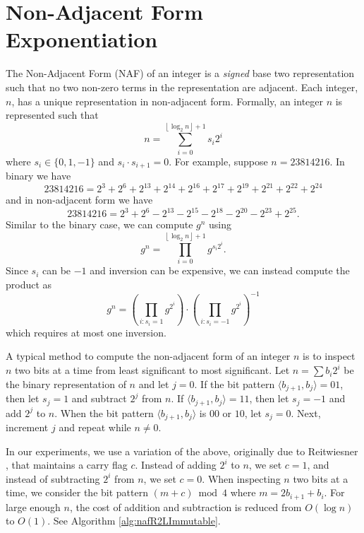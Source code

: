 \documentclass{ucalgthes1}
\theoremstyle{definition}
\newcommand{\floor}[1]{\left\lfloor #1 \right\rfloor}
\begin{document}
\bigbreak
\section{Non-Adjacent Form Exponentiation}
\label{section:naf}

The Non-Adjacent Form (NAF) of an integer is a \emph{signed} base two representation such that no two non-zero terms in the representation are adjacent. Each integer, $n$, has a unique representation in non-adjacent form. Formally, an integer $n$ is represented such that
\[
	n = \sum_{i=0}^{\floor{\log_2 n}+1} s_i 2^i
\]
where $s_i \in \{0, 1, -1\}$ and $s_i \cdot s_{i+1} = 0$. For example, suppose $n = 23814216$.  In binary we have
\begin{equation}\label{eq:binaryEg}
	23814216 = 2^3+2^6+2^{13}+2^{14}+2^{16}+2^{17}+2^{19}+2^{21}+2^{22}+2^{24}
\end{equation}
and in non-adjacent form we have
\begin{equation}\label{eq:nafEg}
	23814216 = 2^3+2^6-2^{13}-2^{15}-2^{18}-2^{20}-2^{23}+2^{25}.
\end{equation}
Similar to the binary case, we can compute $g^n$ using
\[
	g^n = \prod _{i=0}^{\floor{\log_2 n}+1} g^{s_i 2^i}.
\]
Since $s_i$ can be $-1$ and inversion can be expensive, we can instead compute the product as
\[
	g^n = \left( \prod_{i : s_i=1} g^{2^i} \right) \cdot \left( \prod_{i : s_i=-1} g^{2^i} \right)^{-1}
\]
which requires at most one inversion.

A typical method to compute the non-adjacent form of an integer $n$ is to inspect $n$ two bits at a time from least significant to most significant.  Let $n=\sum b_i2^i$ be the binary representation of $n$ and let $j=0$.  If the bit pattern $\langle b_{j+1}, b_j \rangle = 01$, then let $s_j = 1$ and subtract $2^j$ from $n$.  If $\langle b_{j+1}, b_j \rangle = 11$, then let $s_j = -1$ and add $2^j$ to $n$.  When the bit pattern $\langle b_{j+1}, b_j \rangle$ is $00$ or $10$, let $s_j = 0$. Next, increment $j$ and repeat while $n \ne 0$.

In our experiments, we use a variation of the above, originally due to Reitwiesner \cite{reitwiesner1960}, that maintains a carry flag $c$.  Instead of adding $2^i$ to $n$, we set $c = 1$, and instead of subtracting $2^i$ from $n$, we set $c = 0$.  When inspecting $n$ two bits at a time, we consider the bit pattern $(m+c) \bmod 4$ where $m = 2 b_{i+1} + b_i$.  For large enough $n$, the cost of addition and subtraction is reduced from $O(\log n)$ to $O(1)$.  See Algorithm \ref{alg:nafR2LImmutable}.
\end{document}
